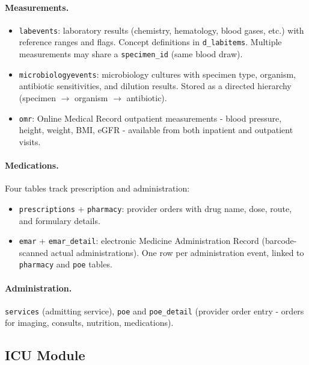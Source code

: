 \documentclass[11pt,a4paper]{article}
\newcommand{\field}[1]{\nolinkurl{#1}}
\begin{document}
\paragraph{Measurements.}
\begin{itemize}[itemsep=2pt, parsep=1pt]
	\item \field{labevents}: laboratory results (chemistry, hematology, blood gases, etc.)
	      with reference ranges and flags.  Concept definitions in \field{d\_labitems}.
	      Multiple measurements may share a \field{specimen\_id} (same blood draw).
	\item \field{microbiologyevents}: microbiology cultures with specimen type, organism,
	      antibiotic sensitivities, and dilution results.  Stored as a directed hierarchy
	      (specimen $\to$ organism $\to$ antibiotic).
	\item \field{omr}: Online Medical Record outpatient measurements - blood pressure, height,
	      weight, BMI, eGFR - available from both inpatient and outpatient visits.
\end{itemize}

\paragraph{Medications.}
Four tables track prescription and administration:
\begin{itemize}[itemsep=2pt, parsep=1pt]
	\item \field{prescriptions} + \field{pharmacy}: provider orders with drug name, dose,
	      route, and formulary details.
	\item \field{emar} + \field{emar\_detail}: electronic Medicine Administration Record
	      (barcode-scanned actual administrations).  One row per administration event,
	      linked to \field{pharmacy} and \field{poe} tables.
\end{itemize}

\paragraph{Administration.}
\field{services} (admitting service), \field{poe} and \field{poe\_detail} (provider order
entry - orders for imaging, consults, nutrition, medications).

\bigskip
\subsection{ICU Module}
\label{sec:icu}
\end{document}
